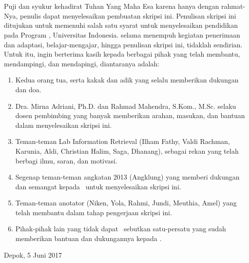 \chapter*{\kataPengantar}
Puji dan syukur kehadirat Tuhan Yang Maha Esa karena hanya dengan rahmat-Nya, penulis dapat menyelesaikan pembuatan skripsi ini. Penulisan skripsi ini ditujukan untuk memenuhi salah satu syarat untuk menyelesaikan pendidikan pada Program \gelar, Universitas Indonesia. \Saya selama menempuh kegiatan penerimaan dan adaptasi, belajar-mengajar, hingga penulisan skripsi ini, tidaklah sendirian. Untuk itu, \Saya  ingin berterima kasih kepada berbagai pihak yang telah membantu, mendampingi, dan mendapingi, diantaranya adalah:

\begin{enumerate}
  \item Kedua orang tua, serta kakak dan adik yang selalu memberikan dukungan dan doa.
  \item Dra. Mirna Adriani, Ph.D. dan Rahmad Mahendra, S.Kom., M.Sc. selaku dosen pembimbing yang banyak memberikan arahan, masukan, dan bantuan dalam menyelesaikan skripsi ini.
  \item Teman-teman Lab Information Retrieval (Ilham Fathy, Valdi Rachman, Karunia, Aldi, Christian Halim, Saga, Dhanang), sebagai rekan yang telah berbagi ilmu, saran, dan motivasi.
  \item Segenap teman-teman angkatan 2013 (Angklung) yang memberi dukungan dan semangat kepada \saya~untuk menyelesaikan skripsi ini.
  \item Teman-teman anotator (Niken, Yola, Rahmi, Jundi, Meuthia, Amel) yang telah membantu dalam tahap pengerjaan skripsi ini.
  \item Pihak-pihak lain yang tidak dapat \saya~sebutkan satu-persatu yang sudah memberikan bantuan dan dukungannya kepada \saya.
\end{enumerate}

\vspace*{0.1cm}
\begin{flushright}
Depok, 5 Juni 2017\\[0.1cm]
\vspace*{1cm}
\penulis

\end{flushright}
